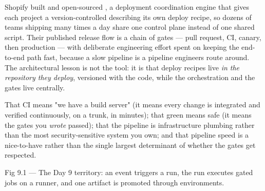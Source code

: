  Shopify built and open-sourced , a deployment coordination engine that gives each project a version-controlled  describing its own deploy recipe, so dozens of teams shipping many times a day share one control plane instead of one shared script. Their published release flow is a chain of gates --- pull request, CI, canary, then production --- with deliberate engineering effort spent on keeping the end-to-end path fast, because a slow pipeline is a pipeline engineers route around. The architectural lesson is not the tool: it is that deploy recipes live \emph{in the repository they deploy}, versioned with the code, while the orchestration and the gates live centrally.

 That CI means "we have a build server" (it means every change is integrated and verified continuously, on a trunk, in minutes); that green means safe (it means the gates you \emph{wrote} passed); that the pipeline is infrastructure plumbing rather than the most security-sensitive system you own; and that pipeline speed is a nice-to-have rather than the single largest determinant of whether the gates get respected.


\begin{wbfigure}{Fig 9.1 — The Day 9 territory: an event triggers a run, the run executes gated jobs on a runner, and one artifact is promoted through environments.}
\end{wbfigure}

